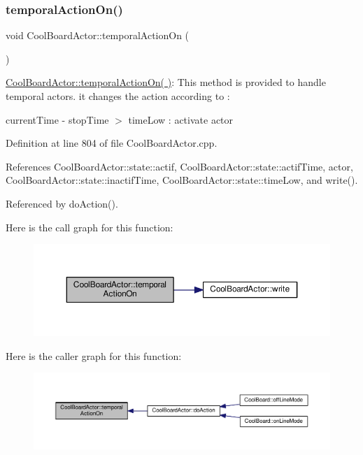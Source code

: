 \subsubsection{\texorpdfstring{temporal\+Action\+On()}{temporalActionOn()}}
{\footnotesize\ttfamily void Cool\+Board\+Actor\+::temporal\+Action\+On (\begin{DoxyParamCaption}{ }\end{DoxyParamCaption})}

\hyperlink{class_cool_board_actor_ada603785c203fdb0b41cc967d70bdc4d}{Cool\+Board\+Actor\+::temporal\+Action\+On( )}\+: This method is provided to handle temporal actors. it changes the action according to \+:

current\+Time -\/ stop\+Time $>$ time\+Low \+: activate actor 

Definition at line 804 of file Cool\+Board\+Actor.\+cpp.



References Cool\+Board\+Actor\+::state\+::actif, Cool\+Board\+Actor\+::state\+::actif\+Time, actor, Cool\+Board\+Actor\+::state\+::inactif\+Time, Cool\+Board\+Actor\+::state\+::time\+Low, and write().



Referenced by do\+Action().

Here is the call graph for this function\+:\nopagebreak
\begin{figure}[H]
\begin{center}
\leavevmode
\includegraphics[width=350pt]{dc/d69/class_cool_board_actor_ada603785c203fdb0b41cc967d70bdc4d_cgraph}
\end{center}
\end{figure}
Here is the caller graph for this function\+:\nopagebreak
\begin{figure}[H]
\begin{center}
\leavevmode
\includegraphics[width=350pt]{dc/d69/class_cool_board_actor_ada603785c203fdb0b41cc967d70bdc4d_icgraph}
\end{center}
\end{figure}
\mbox{\label{class_cool_board_actor_a00b29c4abf0388551aa6812372113cf1}} 

